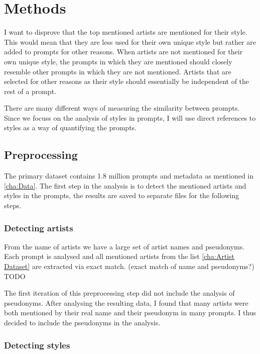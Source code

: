 \chapter{Methods}
\label{cha:Methods}

I want to disprove that the top mentioned artists are mentioned for their style. This would mean that they are less used for their own unique style but rather are added to prompts for other reasons.
When artists are not mentioned for their own unique style, the prompts in which they are mentioned should closely resemble other prompts in which they are not mentioned. Artists that are selected for other reasons as their style should essentially be independent of the rest of a prompt.

There are many different ways of measuring the similarity between prompts. Since we focuss on the analysis of styles in prompts, I will use direct references to styles as a way of quantifying the prompts. 


\section{Preprocessing}

The primary dataset contains 1.8 million prompts and metadata as mentioned in \ref{cha:Data}. The first step in the analysis is to detect the mentioned artists and styles in the prompts, the results are saved to separate files for the following steps.

\subsection{Detecting artists}

From the name of artists we have a large set of artist names and pseudonyms. Each prompt is analysed and all mentioned artists from the list \ref{cha:Artist Dataset} are extracted via exact match. 
(exact match of name and pseudonyms?)
TODO

The first iteration of this preprocessing step did not include the analysis of pseudonyms. After analysing the resulting data, I found that many artists were both mentioned by their real name and their pseudonym in many prompts. I thus decided to include the pseudonyms in the analysis.


\subsection{Detecting styles}

